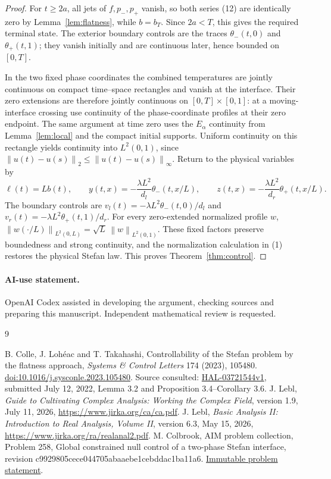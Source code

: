 \documentclass[11pt]{article}
\newcommand{\norm}[1]{\left\lVert#1\right\rVert}
\begin{document}
\begin{proof}
For $t\ge2a$, all jets of $f,p_-,p_+$ vanish, so both series (12)
are identically zero by Lemma~\ref{lem:flatness}, while $b=b_T$. Since $2a<T$, this gives
the required terminal state. The exterior boundary controls are
the traces $\theta_-(t,0)$ and $\theta_+(t,1)$; they vanish initially
and are continuous later, hence bounded on $[0,T]$.

In the two fixed phase coordinates the combined temperatures are
jointly continuous on compact time--space rectangles and vanish
at the interface. Their zero extensions are therefore jointly
continuous on $[0,T]\times[0,1]$: at a moving-interface crossing
use continuity of the phase-coordinate profiles at their zero
endpoint. The same argument at time zero uses the $E_\alpha$
continuity from Lemma~\ref{lem:local} and the compact initial supports. Uniform
continuity on this rectangle yields continuity into $L^2(0,1)$,
since $\norm{u(t)-u(s)}_2\le\norm{u(t)-u(s)}_\infty$.
Return to the physical variables by
\[
 \ell(t)=Lb(t),\qquad
 y(t,x)=-\frac{\lambda L^2}{d_l}\theta_-(t,x/L),\qquad
 z(t,x)=-\frac{\lambda L^2}{d_r}\theta_+(t,x/L).
\]
The boundary controls are
$v_l(t)=-\lambda L^2\theta_-(t,0)/d_l$ and
$v_r(t)=-\lambda L^2\theta_+(t,1)/d_r$.
For every zero-extended normalized profile $w$,
$\norm{w(\cdot/L)}_{L^2(0,L)}=\sqrt L\,\norm{w}_{L^2(0,1)}$.
These fixed factors preserve boundedness and strong continuity, and
the normalization calculation in (1) restores the physical Stefan law.
This proves Theorem~\ref{thm:control}.
\end{proof}

\paragraph{AI-use statement.}
OpenAI Codex assisted in developing the argument, checking sources and
preparing this manuscript. Independent mathematical review is requested.

\begin{thebibliography}{9}
\raggedright
{} B. Colle, J. Loh\'eac and T. Takahashi,
Controllability of the Stefan problem by the flatness approach,
\emph{Systems \& Control Letters} 174 (2023), 105480.
\href{https://doi.org/10.1016/j.sysconle.2023.105480}{doi:10.1016/j.sysconle.2023.105480}.
Source consulted: \href{https://hal.science/hal-03721544v1}{HAL-03721544v1},
submitted July 12, 2022, Lemma 3.2 and Proposition 3.4--Corollary 3.6.
 J. Lebl, \emph{Guide to Cultivating Complex Analysis: Working the Complex Field},
version 1.9, July 11, 2026,
\url{https://www.jirka.org/ca/ca.pdf}.
 J. Lebl, \emph{Basic Analysis II: Introduction to Real Analysis, Volume II},
version 6.3, May 15, 2026,
\url{https://www.jirka.org/ra/realanal2.pdf}.
 M. Colbrook, AIM problem collection,
Problem 258, Global constrained null control of a two-phase Stefan interface,
revision c9929805cece044705abaaebe1cebddac1ba11a6.
\href{https://github.com/MColbrook/AIM/blob/c9929805cece044705abaaebe1cebddac1ba11a6/problems/258-global-two-phase-stefan-control.md}{Immutable problem statement}.
\end{thebibliography}
\end{document}
